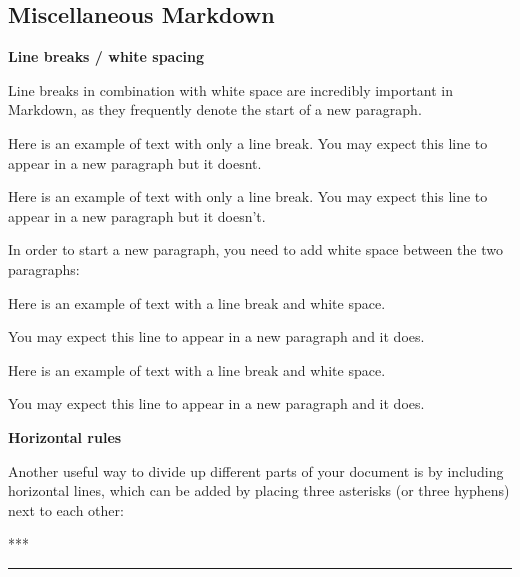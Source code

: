 \documentclass[]{tufte-book}
\newenvironment{Shaded}{\begin{snugshade}}{\end{snugshade}}
\newcommand{\NormalTok}[1]{#1}
\begin{document}
\subsection{Miscellaneous Markdown}\label{miscellaneous-markdown}

\textbf{Line breaks / white spacing}

Line breaks in combination with white space are incredibly important in Markdown, as they frequently denote the start of a new paragraph.

\begin{Shaded}
\begin{Highlighting}[]
\NormalTok{Here is an example of text with only a line break.}
\NormalTok{You may expect this line to appear in a new paragraph but it doesn\textquotesingle{}t.}
\end{Highlighting}
\end{Shaded}

Here is an example of text with only a line break.
You may expect this line to appear in a new paragraph but it doesn't.

In order to start a new paragraph, you need to add white space between the two paragraphs:

\begin{Shaded}
\begin{Highlighting}[]
\NormalTok{Here is an example of text with a line break and white space.}

\NormalTok{You may expect this line to appear in a new paragraph and it does.}
\end{Highlighting}
\end{Shaded}

Here is an example of text with a line break and white space.

You may expect this line to appear in a new paragraph and it does.

\textbf{Horizontal rules}

Another useful way to divide up different parts of your document is by including horizontal lines, which can be added by placing three asterisks (or three hyphens) next to each other:

\begin{Shaded}
\begin{Highlighting}[]
\NormalTok{***}
\end{Highlighting}
\end{Shaded}

\begin{center}\rule{0.5\linewidth}{0.5pt}\end{center}
\end{document}
